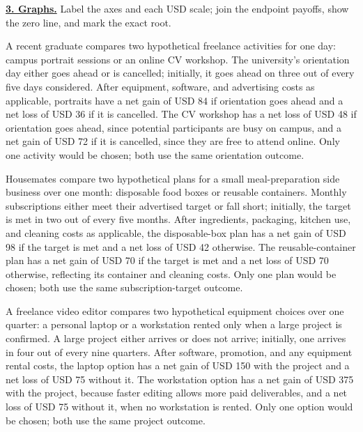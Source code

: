 \textbf{\underline{3. Graphs.}} Label the axes and each USD scale; join the endpoint payoffs, show the zero line, and mark the exact root.


\vspace{-3mm}
A recent graduate compares two hypothetical freelance activities for one day: campus
portrait sessions or an online CV workshop. The university's orientation day either goes
ahead or is cancelled; initially, it goes ahead on three out of every five days considered.
After equipment, software, and advertising costs as applicable, portraits have a net gain
of USD 84 if orientation goes ahead and a net loss of USD 36 if it is cancelled. The CV
workshop has a net loss of USD 48 if orientation goes ahead, since potential participants
are busy on campus, and a net gain of USD 72 if it is cancelled, since they are free to
attend online. Only one activity would be chosen; both use the same orientation outcome.

Housemates compare two hypothetical plans for a small meal-preparation side business over
one month: disposable food boxes or reusable containers. Monthly subscriptions either
meet their advertised target or fall short; initially, the target is met in two out of
every five months. After ingredients, packaging, kitchen use, and cleaning costs as
applicable, the disposable-box plan has a net gain of USD 98 if the target is met and a
net loss of USD 42 otherwise. The reusable-container plan has a net gain of USD 70 if the
target is met and a net loss of USD 70 otherwise, reflecting its container and cleaning
costs. Only one plan would be chosen; both use the same subscription-target outcome.

A freelance video editor compares two hypothetical equipment choices over one quarter:
a personal laptop or a workstation rented only when a large project is confirmed.
A large project either arrives or does not arrive; initially, one arrives in four out
of every nine quarters. After software, promotion, and any equipment rental costs, the
laptop option has a net gain of USD 150 with the project and a net loss of USD 75 without
it. The workstation option has a net gain of USD 375 with the project, because faster
editing allows more paid deliverables, and a net loss of USD 75 without it, when no
workstation is rented. Only one option would be chosen; both use the same project outcome.

